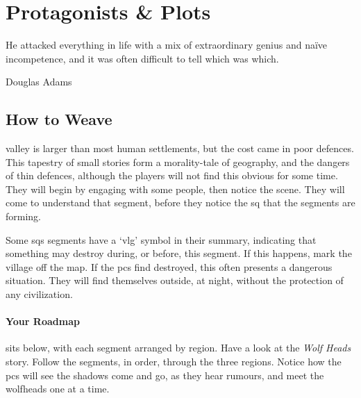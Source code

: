 \chapter{Protagonists \& Plots}
  \epigraph{He attacked everything in life with a mix of extraordinary genius and na\"ive incompetence, and it was often difficult to tell which was which.}{Douglas Adams}
\label{sideQuestIntro}

\section{How to Weave}
\label{sqSummaries}

\begin{multicols}{2}

\noindent
\Gls{valley} is larger than most human settlements, but the cost came in poor defences.
This tapestry of small stories form a morality-tale of geography, and the dangers of thin defences, although the players will not find this obvious for some time.
They will begin by engaging with some people, then notice the scene.
They will come to understand that \gls{segment}, before they notice the \gls{sq} that the \glspl{segment} are forming.

Some \glspl{sq} \glspl{segment} have a `\gls{vlg}' symbol in their summary, indicating that something may destroy  during, or before, this \gls{segment}.
If this happens, mark the \gls{village} off the map.
If the \glspl{pc} find  destroyed, this often presents a dangerous situation.
They will find themselves outside, at night, without the protection of any civilization.

\subsubsection{Your Roadmap}
sits below, with each \gls{segment} arranged by \gls{region}.
Have a look at the \textit{Wolf Heads} story.
Follow the \glspl{segment}, in order, through the three \glspl{region}.
Notice how the \glspl{pc} will see the shadows come and go, as they hear rumours, and meet the \glspl{wolfhead} one at a time.


\renewcommand\csComments{
  \mapCircle{16}{76}{1.7}{Dyson_Logos/bandit_camp}
  \mapCircle{35}{88}{2}{Dyson_Logos/forgotten_city}
  \mapCircle{27}{09}{2}{Dyson_Logos/qualme_temple}
  \mapCircle[4]{56}{52}{2.5}{Dyson_Logos/town}
  \mapCircle{44}{41}{2}{Dyson_Logos/redfall}
  \mapCircle{83}{09}{1.7}{Dyson_Logos/shadow_gate}
  \mapCircle{86}{45}{1.7}{Dyson_Logos/lochside}
  \draw[very thick,white] (11,0.6) -- (12,0.6) node[anchor=north]{\outline{10 Miles}} -- (13,0.6) ;
}


\end{multicols}
